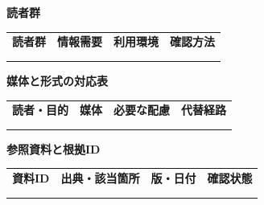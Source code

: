 \documentclass[11pt,a4paper]{article}
\begin{document}
\par{}\noindent\textbf{読者群}\par\vspace{1mm}
{\fontsize{8.5}{13}\selectfont
\begin{tabularx}{\linewidth}{@{}XXXX@{}}
\textbf{読者群} & \textbf{情報需要} & \textbf{利用環境} & \textbf{確認方法}\\[2mm]
\strut & \strut & \strut & \strut\\[5mm]
\strut & \strut & \strut & \strut\\[5mm]
\end{tabularx}
}\vspace{2mm}\par
{}
\par{}\noindent\textbf{媒体と形式の対応表}\par\vspace{1mm}
{\fontsize{8.5}{13}\selectfont
\begin{tabularx}{\linewidth}{@{}XXXX@{}}
\textbf{読者・目的} & \textbf{媒体} & \textbf{必要な配慮} & \textbf{代替経路}\\[2mm]
\strut & \strut & \strut & \strut\\[5mm]
\strut & \strut & \strut & \strut\\[5mm]
\end{tabularx}
}\vspace{2mm}\par
{}
\par{}\noindent\textbf{参照資料と根拠ID}\par\vspace{1mm}
{\fontsize{8.5}{13}\selectfont
\begin{tabularx}{\linewidth}{@{}XXXX@{}}
\textbf{資料ID} & \textbf{出典・該当箇所} & \textbf{版・日付} & \textbf{確認状態}\\[2mm]
\strut & \strut & \strut & \strut\\[5mm]
\strut & \strut & \strut & \strut\\[5mm]
\end{tabularx}
}\vspace{2mm}\par
\end{document}
